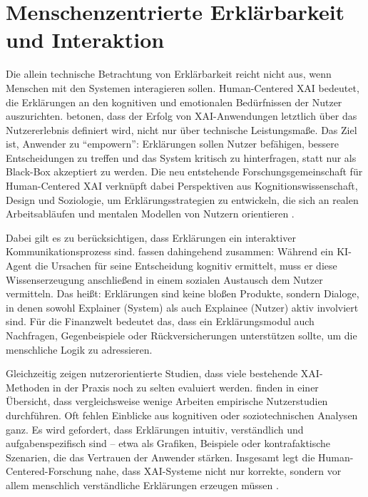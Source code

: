 \section{Menschenzentrierte Erklärbarkeit und Interaktion}

  Die allein technische Betrachtung von Erklärbarkeit reicht nicht aus, wenn Menschen mit den Systemen interagieren sollen.
  Human-Centered \acs{XAI} bedeutet, die Erklärungen an den kognitiven und emotionalen Bedürfnissen der Nutzer auszurichten.
  \textcite[S. 1 und 2]{Liao2022} betonen, dass der Erfolg von \acs{XAI}-Anwendungen letztlich über das Nutzererlebnis definiert wird, nicht nur über technische Leistungsmaße.
  Das Ziel ist, Anwender zu \enquote{empowern}: Erklärungen sollen Nutzer befähigen, bessere Entscheidungen zu treffen und das System kritisch zu hinterfragen, statt nur als Black-Box akzeptiert zu werden.
  Die neu entstehende Forschungsgemeinschaft für Human-Centered \acs{XAI} verknüpft dabei Perspektiven aus Kognitionswissenschaft, Design und Soziologie, um Erklärungsstrategien zu entwickeln, die sich an realen Arbeitsabläufen und mentalen Modellen von Nutzern orientieren \autocite[S. 1 und 3]{Liao2022}.

  Dabei gilt es zu berücksichtigen, dass Erklärungen ein interaktiver Kommunikationsprozess sind.
  \textcite[S. 2]{Kopecka2020} fassen \textcite{miller2017inmates} dahingehend zusammen:
  Während ein KI-Agent die Ursachen für seine Entscheidung kognitiv ermittelt, muss er diese Wissenserzeugung anschließend in einem sozialen Austausch dem Nutzer vermitteln.
  Das heißt: Erklärungen sind keine bloßen Produkte, sondern Dialoge, in denen sowohl Explainer (System) als auch Explainee (Nutzer) aktiv involviert sind.
  Für die Finanzwelt bedeutet das, dass ein Erklärungsmodul auch Nachfragen, Gegenbeispiele oder Rückversicherungen unterstützen sollte, um die menschliche Logik zu adressieren.

  Gleichzeitig zeigen nutzerorientierte Studien, dass viele bestehende \acs{XAI}-Methoden in der Praxis noch zu selten evaluiert werden.
  \textcite[S. 7-12]{Rong2022} finden in einer Übersicht, dass vergleichsweise wenige Arbeiten empirische Nutzerstudien durchführen.
  Oft fehlen Einblicke aus kognitiven oder soziotechnischen Analysen ganz.
  Es wird gefordert, dass Erklärungen intuitiv, verständlich und aufgabenspezifisch sind – etwa als Grafiken, Beispiele oder kontrafaktische Szenarien, die das Vertrauen der Anwender stärken.
  Insgesamt legt die Human-Centered-Forschung nahe, dass \acs{XAI}-Systeme nicht nur korrekte, sondern vor allem menschlich verständliche Erklärungen erzeugen müssen \autocite{Liao2022, Rong2022}.

